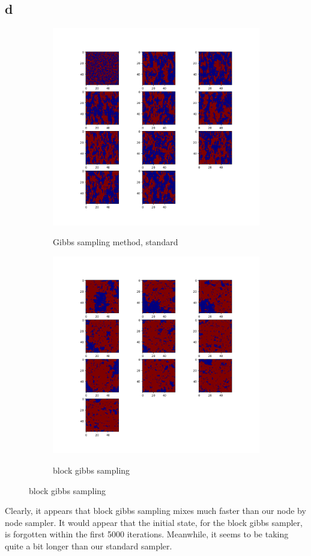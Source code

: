 \documentclass[12pt]{article}
\begin{document}
\begin{section}{8.2}
	\subsection{d}
	\begin{figure}[H]
		\centering
		\begin{subfigure}{.5\textwidth}
			\centering
			\includegraphics[width=.8\linewidth]{myq82.png}
			\label{82my}
			\caption{Gibbs sampling method, standard}
		\end{subfigure}%
		\begin{subfigure}{.5\textwidth}
			\centering
			\includegraphics[width=.8\linewidth]{hisq82.png}
			\label{82his}
			\caption{block gibbs sampling}
		\end{subfigure}
		\label{82}
	\end{figure}
	Clearly, it appears that block gibbs sampling mixes much faster than our node by node sampler. It would appear that the initial state, for the block gibbs sampler, is forgotten within the first 5000 iterations. Meanwhile, it seems to be taking quite a bit longer than our standard sampler.
\end{section}
\end{document}
